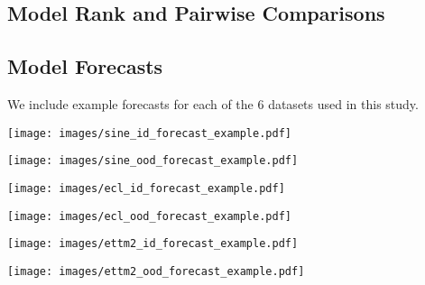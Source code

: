 \subsection{Model Rank and Pairwise Comparisons}\label{apd:cd_diagrams}


\newpage
\subsection{Model Forecasts}\label{apd:forecast_examples}
We include example forecasts for each of the 6 datasets used in this study.


\begin{figure*}[ht!]
    \centering

    \begin{minipage}{0.411\textwidth}
        \centering
        \texttt{[image: images/sine\_id\_forecast\_example.pdf]}
        \label{fig:sine_id_forecast_example}
    \end{minipage}
    \hfill
    \begin{minipage}{0.584\textwidth}
        \centering
        \texttt{[image: images/sine\_ood\_forecast\_example.pdf]}
        \label{fig:sine_ood_forecast_example.pdf}
    \end{minipage}

    \vspace{2.9em}
    
    \begin{minipage}{0.411\textwidth}
        \centering
        \texttt{[image: images/ecl\_id\_forecast\_example.pdf]}
        \label{fig:ecl_id_forecast_example}
    \end{minipage}
    \hfill
    \begin{minipage}{0.584\textwidth}
        \centering
        \texttt{[image: images/ecl\_ood\_forecast\_example.pdf]}
        \label{fig:ecl_ood_forecast_example.pdf}
    \end{minipage}

    \vspace{2.9em}
    
    \begin{minipage}{0.411\textwidth}
        \centering
        \texttt{[image: images/ettm2\_id\_forecast\_example.pdf]}
        \label{fig:ettm2_id_forecast_example}
    \end{minipage}
    \hfill
    \begin{minipage}{0.584\textwidth}
        \centering
        \texttt{[image: images/ettm2\_ood\_forecast\_example.pdf]}
        \label{fig:ettm2_ood_forecast_example.pdf}
    \end{minipage}


\end{figure*}
